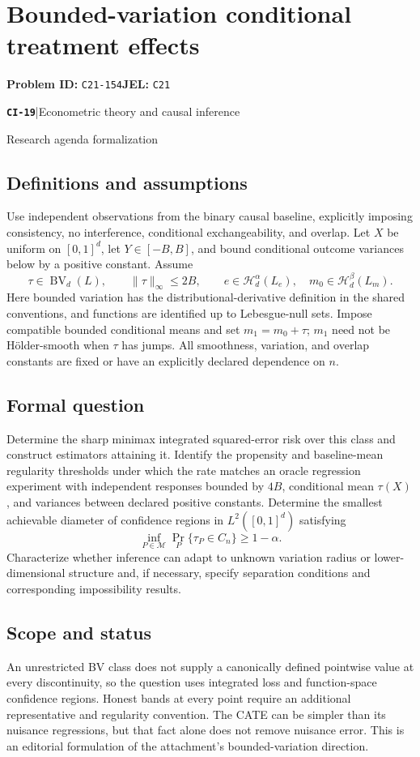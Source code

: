 \documentclass[11pt,a4paper]{article}
\newcommand{\entrymeta}[3]{{\sffamily\small\color{muted}\textbf{\texttt{#1}}\quad|\quad #2\par #3\par}}
\begin{document}
\section*{Bounded-variation conditional treatment effects}
\textbf{Problem ID:} \texttt{C21-154}\quad \textbf{JEL:} \texttt{C21}\par
\label{problem:OP-0498}
\label{beyond:CI-19}
\entrymeta{CI-19}{Econometric theory and causal inference}{Research agenda formalization}
\subsection*{Definitions and assumptions}
Use independent observations from the binary causal baseline, explicitly imposing consistency, no interference, conditional exchangeability, and overlap. Let $X$ be uniform on $[0,1]^d$, let $Y\in[-B,B]$, and bound conditional outcome variances below by a positive constant. Assume
\[
\tau\in\operatorname{BV}_d(L),\qquad
\|\tau\|_\infty\leq2B,\qquad
e\in\mathcal H_d^\alpha(L_e),\quad
m_0\in\mathcal H_d^\beta(L_m).
\]
Here bounded variation has the distributional-derivative definition in the shared conventions, and functions are identified up to Lebesgue-null sets. Impose compatible bounded conditional means and set $m_1=m_0+\tau$; $m_1$ need not be Hölder-smooth when $\tau$ has jumps. All smoothness, variation, and overlap constants are fixed or have an explicitly declared dependence on $n$.
\subsection*{Formal question}
Determine the sharp minimax integrated squared-error risk over this class and construct estimators attaining it. Identify the propensity and baseline-mean regularity thresholds under which the rate matches an oracle regression experiment with independent responses bounded by $4B$, conditional mean $\tau(X)$, and variances between declared positive constants. Determine the smallest achievable diameter of confidence regions in $L^2([0,1]^d)$ satisfying
\[
\inf_{P\in\mathcal M}\Pr_P\{\tau_P\in C_n\}\geq1-\alpha.
\]
Characterize whether inference can adapt to unknown variation radius or lower-dimensional structure and, if necessary, specify separation conditions and corresponding impossibility results.
\subsection*{Scope and status}
An unrestricted BV class does not supply a canonically defined pointwise value at every discontinuity, so the question uses integrated loss and function-space confidence regions. Honest bands at every point require an additional representative and regularity convention. The CATE can be simpler than its nuisance regressions, but that fact alone does not remove nuisance error. This is an editorial formulation of the attachment's bounded-variation direction.
\end{document}
